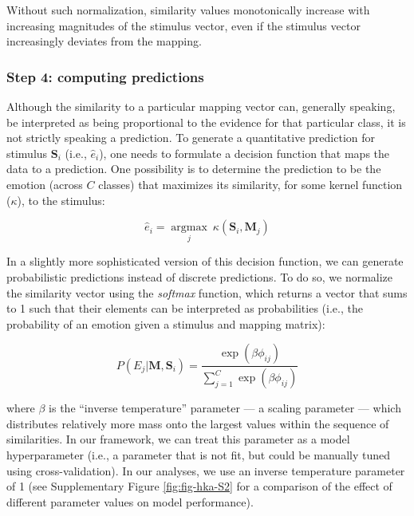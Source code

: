 \documentclass[12pt,american,a4paper,oneside,]{memoir} %
\begin{document}
Without such normalization, similarity values monotonically increase with increasing magnitudes of the stimulus vector, even if the stimulus vector increasingly deviates from the mapping.

\hypertarget{step-4-computing-predictions}{%
\subsubsection{Step 4: computing predictions}\label{step-4-computing-predictions}}

Although the similarity to a particular mapping vector can, generally speaking, be interpreted as being proportional to the evidence for that particular class, it is not strictly speaking a prediction. To generate a quantitative prediction for stimulus \(\mathbf{S}_{i}\) (i.e., \(\hat{e}_{i}\)), one needs to formulate a decision function that maps the data to a prediction. One possibility is to determine the prediction to be the emotion (across \(C\) classes) that maximizes its similarity, for some kernel function (\(\kappa\)), to the stimulus:

\begin{equation}
\hat{e}_{i} = \underset{j}{\operatorname{\mathrm{argmax}}}\ \kappa(\mathbf{S}_{i}, \mathbf{M}_{j})
\end{equation}

In a slightly more sophisticated version of this decision function, we can generate probabilistic predictions instead of discrete predictions. To do so, we normalize the similarity vector using the \emph{softmax} function, which returns a vector that sums to 1 such that their elements can be interpreted as probabilities (i.e., the probability of an emotion given a stimulus and mapping matrix):

\begin{equation}
P(E_{j} | \mathbf{M}, \mathbf{S}_{i}) = \frac{\exp(\beta\phi_{ij})}{\sum_{j=1}^{C}\exp(\beta\phi_{ij})}
\end{equation}

where \(\beta\) is the ``inverse temperature'' parameter --- a scaling parameter --- which distributes relatively more mass onto the largest values within the sequence of similarities. In our framework, we can treat this parameter as a model hyperparameter (i.e., a parameter that is not fit, but could be manually tuned using cross-validation). In our analyses, we use an inverse temperature parameter of 1 (see Supplementary Figure \ref{fig:fig-hka-S2} for a comparison of the effect of different parameter values on model performance).
\end{document}
